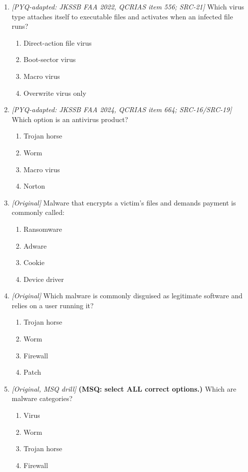 \begin{enumerate}[label=\textbf{Q\arabic*.}, leftmargin=*]
\begin{enumerate}[label=\Alph*.]
    \item Antivirus updates increase infection risk.
  \end{enumerate}
\item \textit{[PYQ-adapted: JKSSB FAA 2022, QCRIAS item 556; SRC-21]} Which virus type attaches itself to executable files and activates when an infected file runs?
  \begin{enumerate}[label=\Alph*.]
\item Direct-action file virus
   \item Boot-sector virus
   \item Macro virus
   \item Overwrite virus only
  \end{enumerate}

\item \textit{[PYQ-adapted: JKSSB FAA 2024, QCRIAS item 664; SRC-16/SRC-19]} Which option is an antivirus product?
  \begin{enumerate}[label=\Alph*.]
\item Trojan horse
   \item Worm
   \item Macro virus
   \item Norton
  \end{enumerate}

\item \textit{[Original]} Malware that encrypts a victim's files and demands payment is commonly called:
  \begin{enumerate}[label=\Alph*.]
\item Ransomware
   \item Adware
   \item Cookie
   \item Device driver
  \end{enumerate}

\item \textit{[Original]} Which malware is commonly disguised as legitimate software and relies on a user running it?
  \begin{enumerate}[label=\Alph*.]
\item Trojan horse
   \item Worm
   \item Firewall
   \item Patch
  \end{enumerate}

\item \textit{[Original, MSQ drill]} \textbf{(MSQ: select ALL correct options.)} Which are malware categories?
  \begin{enumerate}[label=\Alph*.]
\item Virus
   \item Worm
   \item Trojan horse
   \item Firewall
  \end{enumerate}

\end{enumerate}

